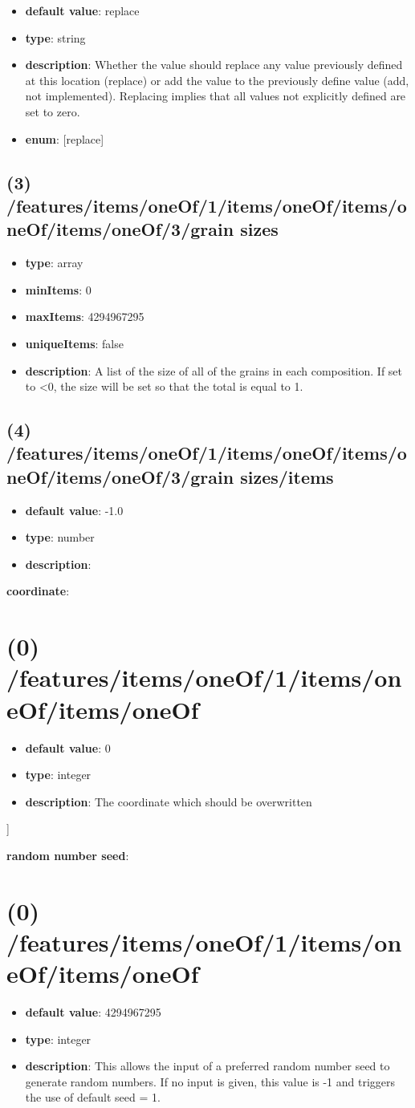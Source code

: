 \begin{itemize}[leftmargin=3em]\item {\bf default value}: replace
\item {\bf type}: string
\item {\bf description}: Whether the value should replace any value previously defined at this location (replace) or add the value to the previously define value (add, not implemented). Replacing implies that all values not explicitly defined are set to zero.
\item {\bf enum}: [replace]\end{itemize}\subsection{(3) /features/items/oneOf/1/items/oneOf/items/oneOf/items/oneOf/3/grain sizes}
\begin{itemize}[leftmargin=3em]\item {\bf type}: array
\item {\bf minItems}: 0
\item {\bf maxItems}: 4294967295
\item {\bf uniqueItems}: false
\item {\bf description}: A list of the size of all of the grains in each composition. If set to <0, the size will be set so that the total is equal to 1.
\end{itemize}\subsection{(4) /features/items/oneOf/1/items/oneOf/items/oneOf/items/oneOf/3/grain sizes/items}
\begin{itemize}[leftmargin=4em]\item {\bf default value}: -1.0
\item {\bf type}: number
\item {\bf description}: 
\end{itemize}\item {\bf coordinate}: \section{(0) /features/items/oneOf/1/items/oneOf/items/oneOf}
\begin{itemize}[leftmargin=0em]\item {\bf default value}: 0
\item {\bf type}: integer
\item {\bf description}: The coordinate which should be overwritten
\end{itemize}]\item {\bf random number seed}: \section{(0) /features/items/oneOf/1/items/oneOf/items/oneOf}
\begin{itemize}[leftmargin=0em]\item {\bf default value}: 4294967295
\item {\bf type}: integer
\item {\bf description}: This allows the input of a preferred random number seed to generate random numbers. If no input is given, this value is -1 and triggers the use of default seed = 1.
\end{itemize}